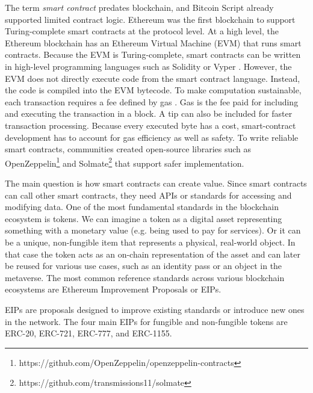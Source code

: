 The term \emph{smart contract} predates blockchain, and Bitcoin Script already supported limited contract logic. Ethereum was the first blockchain to support Turing-complete smart contracts at the protocol level. At a high level, the Ethereum blockchain has an Ethereum Virtual Machine (EVM) that runs smart contracts.
Because the EVM is Turing-complete, smart contracts can be written in high-level programming languages such as Solidity or Vyper \cite{antonopoulos2018mastering}.
However, the EVM does not directly execute code from the smart contract language. Instead, the code is compiled into the EVM bytecode.
To make computation sustainable, each transaction requires a fee defined by gas \cite{Leonardos2021, Roughgarden2020}. Gas is the fee paid for including and executing the transaction in a block. A tip can also be included for faster transaction processing.
Because every executed byte has a cost, smart-contract development has to account for gas efficiency as well as safety.
To write reliable smart contracts, communities created
open-source libraries such as OpenZeppelin\footnote{https://github.com/OpenZeppelin/openzeppelin-contracts} and Solmate\footnote{https://github.com/transmissions11/solmate} that support safer implementation.


The main question is how smart contracts can create value.
Since smart contracts can call other smart contracts, they need APIs or standards for accessing and modifying data.
One of the most fundamental standards in the blockchain ecosystem is tokens. We can imagine a token as a digital asset representing something with a monetary value (e.g. being used to pay for services).
Or it can be a unique, non-fungible item that represents a physical, real-world object.
In that case the token acts as an on-chain representation of the asset and can later be reused for various use cases, such as an identity pass or an object in the metaverse.
The most common reference standards across various blockchain ecosystems are Ethereum Improvement Proposals or EIPs.

EIPs are proposals designed to improve existing standards or introduce new ones in the network.
The four main EIPs for fungible and non-fungible tokens are ERC-20, ERC-721, ERC-777, and ERC-1155.


